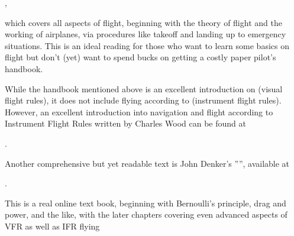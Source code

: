 ,
\medskip

 \noindent
which covers all aspects of flight, beginning with the theory of flight and the working
of airplanes, via procedures like takeoff and landing up to emergency situations. This is
an ideal reading for those who want to learn some basics on flight but don't (yet) want
to spend bucks on getting a costly paper pilot's handbook.

While the handbook mentioned above is an excellent introduction on  (visual
flight rules), it does not include flying according to  (instrument flight
rules). However, an excellent introduction into navigation and flight according to
Instrument Flight Rules written by Charles Wood can be found at

.

Another comprehensive but yet readable text is John Denker's
'''', available at
\medskip

.
\medskip

 \noindent
This is a real online text book, beginning with Bernoulli's principle, drag and power,
and the like, with the later chapters covering even advanced aspects of VFR as well as
IFR flying


